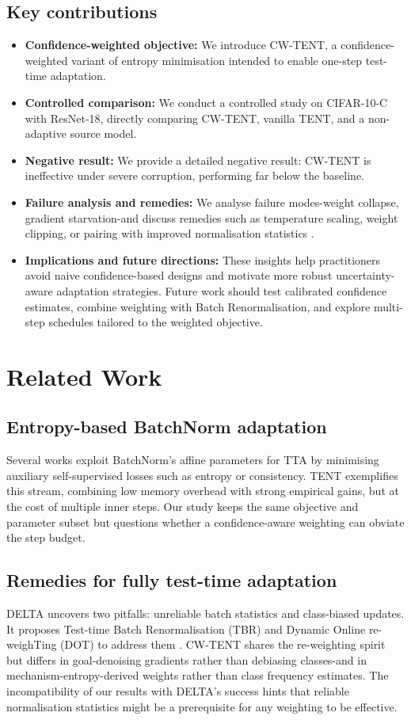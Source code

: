 \documentclass{article} %
\begin{document}
\subsection{Key contributions}
\begin{itemize}
  \item \textbf{Confidence-weighted objective:} We introduce CW-TENT, a confidence-weighted variant of entropy minimisation intended to enable one-step test-time adaptation.
  \item \textbf{Controlled comparison:} We conduct a controlled study on CIFAR-10-C with ResNet-18, directly comparing CW-TENT, vanilla TENT, and a non-adaptive source model.
  \item \textbf{Negative result:} We provide a detailed negative result: CW-TENT is ineffective under severe corruption, performing far below the baseline.
  \item \textbf{Failure analysis and remedies:} We analyse failure modes-weight collapse, gradient starvation-and discuss remedies such as temperature scaling, weight clipping, or pairing with improved normalisation statistics \cite{zhao-2023-delta}.
  \item \textbf{Implications and future directions:} These insights help practitioners avoid naive confidence-based designs and motivate more robust uncertainty-aware adaptation strategies. Future work should test calibrated confidence estimates, combine weighting with Batch Renormalisation, and explore multi-step schedules tailored to the weighted objective.
\end{itemize}

\section{Related Work}
\label{sec:related}
\subsection{Entropy-based BatchNorm adaptation}
Several works exploit BatchNorm's affine parameters for TTA by minimising auxiliary self-supervised losses such as entropy or consistency. TENT exemplifies this stream, combining low memory overhead with strong empirical gains, but at the cost of multiple inner steps. Our study keeps the same objective and parameter subset but questions whether a confidence-aware weighting can obviate the step budget.

\subsection{Remedies for fully test-time adaptation}
DELTA uncovers two pitfalls: unreliable batch statistics and class-biased updates. It proposes Test-time Batch Renormalisation (TBR) and Dynamic Online re-weighTing (DOT) to address them \cite{zhao-2023-delta}. CW-TENT shares the re-weighting spirit but differs in goal-denoising gradients rather than debiasing classes-and in mechanism-entropy-derived weights rather than class frequency estimates. The incompatibility of our results with DELTA's success hints that reliable normalisation statistics might be a prerequisite for any weighting to be effective.
\end{document}
